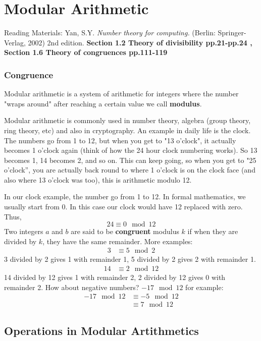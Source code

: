 \chapter{Modular Arithmetic}
Reading Materials: \newline
Yan, S.Y. \textit{Number theory for computing.} (Berlin: Springer-Verlag, 2002) 2nd edition. \textbf{Section 1.2 Theory of divisibility pp.21-pp.24 , Section 1.6 Theory of congruences pp.111-119}
\subsection{Congruence}
\noindent Modular arithmetic is a system of arithmetic for integers where the number "wraps around" after reaching a certain value we call \textbf{modulus}.

\vspace{5mm}

\noindent Modular arithmetic is commonly used in number theory, algebra (group theory, ring theory, etc) and also in cryptography. An example in daily life is the clock. The numbers go from 1 to 12, but when you get to "13 o'clock", it actually becomes 1 o'clock again (think of how the 24 hour clock numbering works). So 13 becomes 1, 14 becomes 2, and so on. This can keep going, so when you get to "25 o'clock'', you are actually back round to where 1 o'clock is on the clock face (and also where 13 o'clock was too), this is arithmetic modulo 12.

\vspace{5mm}

\noindent In our clock example, the number go from 1 to 12. In formal mathematics, we usually start from 0. In this case our clock would have 12 replaced with zero. Thus,
\begin{equation}
24\equiv 0 \mod{12}
\end{equation}
\noindent Two integers $a$ and $b$ are said to be \textbf{congruent} modulus $k$ if when they are divided by $k$, they have the same remainder.
\vspace{5mm}
\noindent More examples:
\begin{equation}
\begin{split}
3 &\equiv 5 \mod{2} 
\end{split}
\end{equation}
3 divided by 2 gives 1 with remainder 1, 5 divided by 2 gives 2 with remainder 1.
\begin{equation}
\begin{split}
14 &\equiv 2 \mod{12} 
\end{split}
\end{equation}
14 divided by 12 gives 1 with remainder 2, 2 divided by 12 gives 0 with remainder 2.
\vspace{5mm}
\noindent How about negative numbers? $-17 \mod{12} $ for example:
\begin{equation}
\begin{split}
-17 \mod{12} & \equiv -5\mod{12}\\
 & \equiv 7 \mod{12}
\end{split}
\end{equation}
\section{Operations in Modular Artithmetics}